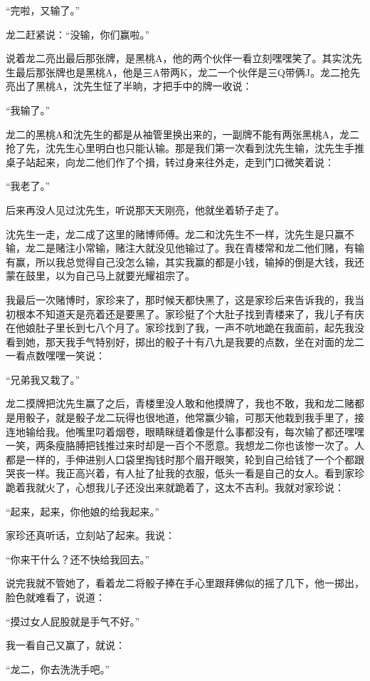 \documentclass[12pt,UTF8]{ctexbook}
\begin{document}
“完啦，又输了。”

龙二赶紧说：“没输，你们赢啦。”

说着龙二亮出最后那张牌，是黑桃A，他的两个伙伴一看立刻嘿嘿笑了。其实沈先生最后那张牌也是黑桃A，他是三A带两K，龙二一个伙伴是三Q带俩J。龙二抢先亮出了黑桃A，沈先生怔了半晌，才把手中的牌一收说：

“我输了。”

龙二的黑桃A和沈先生的都是从袖管里换出来的，一副牌不能有两张黑桃A，龙二抢了先，沈先生心里明白也只能认输。那是我们第一次看到沈先生输，沈先生手推桌子站起来，向龙二他们作了个揖，转过身来往外走，走到门口微笑着说：

“我老了。”

后来再没人见过沈先生，听说那天天刚亮，他就坐着轿子走了。

沈先生一走，龙二成了这里的赌博师傅。龙二和沈先生不一样，沈先生是只赢不输，龙二是赌注小常输，赌注大就没见他输过了。我在青楼常和龙二他们赌，有输有赢，所以我总觉得自己没怎么输，其实我赢的都是小钱，输掉的倒是大钱，我还蒙在鼓里，以为自己马上就要光耀祖宗了。

我最后一次赌博时，家珍来了，那时候天都快黑了，这是家珍后来告诉我的，我当初根本不知道天是亮着还是要黑了。家珍挺了个大肚子找到青楼来了，我儿子有庆在他娘肚子里长到七八个月了。家珍找到了我，一声不吭地跪在我面前，起先我没看到她，那天我手气特别好，掷出的骰子十有八九是我要的点数，坐在对面的龙二一看点数嘿嘿一笑说：

“兄弟我又栽了。”

龙二摸牌把沈先生赢了之后，青楼里没人敢和他摸牌了，我也不敢，我和龙二赌都是用骰子，就是骰子龙二玩得也很地道，他常赢少输，可那天他栽到我手里了，接连地输给我。他嘴里叼着烟卷，眼睛眯缝着像是什么事都没有，每次输了都还嘿嘿一笑，两条瘦胳膊把钱推过来时却是一百个不愿意。我想龙二你也该惨一次了。人都是一样的，手伸进别人口袋里掏钱时那个眉开眼笑，轮到自己给钱了一个个都跟哭丧一样。我正高兴着，有人扯了扯我的衣服，低头一看是自己的女人。看到家珍跪着我就火了，心想我儿子还没出来就跪着了，这太不吉利。我就对家珍说：

“起来，起来，你他娘的给我起来。”

家珍还真听话，立刻站了起来。我说：

“你来干什么？还不快给我回去。”

说完我就不管她了，看着龙二将骰子捧在手心里跟拜佛似的摇了几下，他一掷出，脸色就难看了，说道：

“摸过女人屁股就是手气不好。”

我一看自己又赢了，就说：

“龙二，你去洗洗手吧。”
\end{document}
